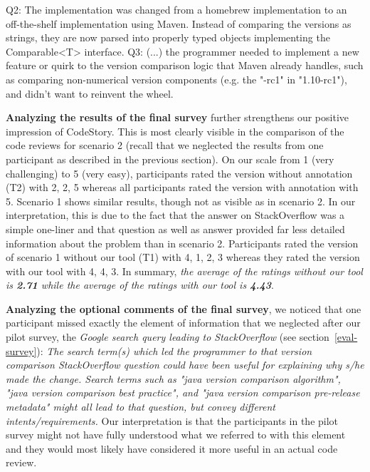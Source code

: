 \documentclass[../manifest.tex]{subfiles}
\begin{document}
\begin{itemize}
{Q2: The implementation was changed from a homebrew implementation to an off-the-shelf implementation using Maven. Instead of comparing the versions as strings, they are now parsed into properly typed objects implementing the Comparable<T> interface.
Q3: (...) the programmer needed to implement a new feature or quirk to the version comparison logic that Maven already handles, such as comparing non-numerical version components (e.g. the "-rc1" in "1.10-rc1"), and didn't want to reinvent the wheel.
}
\end{itemize}

\textbf{Analyzing the results of the final survey} further strengthens our positive impression of CodeStory. This is most clearly visible in the comparison of the code reviews for scenario 2 (recall that we neglected the results from one participant as described in the previous section). On our scale from 1 (very challenging) to 5 (very easy), participants rated the version without annotation (T2) with 2, 2, 5 whereas all participants rated the version with annotation with 5. Scenario 1 shows similar results, though not as visible as in scenario 2. In our interpretation, this is due to the fact that the answer on StackOverflow was a simple one-liner and that question as well as answer provided far less detailed information about the problem than in scenario 2. Participants rated the version of scenario 1 without our tool (T1) with 4, 1, 2, 3 whereas they rated the version with our tool with 4, 4, 3. In summary, \textit{the average of the ratings without our tool is \textbf{2.71} while the average of the ratings with our tool is \textbf{4.43}}.

\textbf{Analyzing the optional comments of the final survey}, we noticed that one participant missed exactly the element of information that we neglected after our pilot survey, the \textit{Google search query leading to StackOverflow} (see section~\ref{eval-survey}): \textit{The search term(s) which led the programmer to that version comparison StackOverflow question could have been useful for explaining why s/he made the change. Search terms such as "java version comparison algorithm", "java version comparison best practice", and "java version comparison pre-release metadata" might all lead to that question, but convey different intents/requirements.} Our interpretation is that the participants in the pilot survey might not have fully understood what we referred to with this element and they would most likely have considered it more useful in an actual code review.
\end{document}

